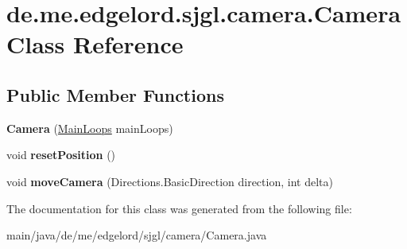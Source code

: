 \hypertarget{classde_1_1me_1_1edgelord_1_1sjgl_1_1camera_1_1_camera}{}\section{de.\+me.\+edgelord.\+sjgl.\+camera.\+Camera Class Reference}
\label{classde_1_1me_1_1edgelord_1_1sjgl_1_1camera_1_1_camera}
\subsection*{Public Member Functions}
\begin{DoxyCompactItemize}
\item 
\mbox{\label{classde_1_1me_1_1edgelord_1_1sjgl_1_1camera_1_1_camera_a19d88c9a1d57a12826bad2ed18d6b95f}} 
{\bfseries Camera} (\mbox{\hyperlink{classde_1_1me_1_1edgelord_1_1sjgl_1_1core_1_1_main_loops}{Main\+Loops}} main\+Loops)
\item 
\mbox{\label{classde_1_1me_1_1edgelord_1_1sjgl_1_1camera_1_1_camera_ae81bc71498ee0ab427a0c9efb9ffb35a}} 
void {\bfseries reset\+Position} ()
\item 
\mbox{\label{classde_1_1me_1_1edgelord_1_1sjgl_1_1camera_1_1_camera_a4b83fcc3f3ae64c5283b58efbc0cf9da}} 
void {\bfseries move\+Camera} (Directions.\+Basic\+Direction direction, int delta)
\end{DoxyCompactItemize}


The documentation for this class was generated from the following file\+:\begin{DoxyCompactItemize}
\item 
main/java/de/me/edgelord/sjgl/camera/Camera.\+java\end{DoxyCompactItemize}

